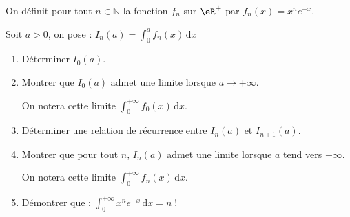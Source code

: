 
\begin{exercice}\label{exoautoanalyseCTU-30}


    On définit pour tout $n\in\mathbb{N}$ la fonction $f_n$ sur $\eR^+$ par $f_n(x)=
    x^n e^{-x}$. 
    
    Soit $a>0$, on pose :
       $ I_n(a) =\displaystyle \int_0^a f_n(x) \,\mathrm dx$

    \begin{enumerate}
        \item Déterminer $I_0(a)$.
        \item Montrer que $I_0(a)$ admet une limite lorsque $a\to+\infty$. 
        
        On notera cette limite
            $\displaystyle\int_0^{+\infty} f_0(x)\,\mathrm dx$.
        \item Déterminer une relation de récurrence entre $I_n(a)$ et $I_{n+1}(a)$.
        \item Montrer que pour tout $n$, $I_n(a)$ admet une limite lorsque $a$ tend vers $+\infty$.
        
            On notera cette limite $\displaystyle\int_0^{+\infty} f_n(x)\,\mathrm dx$.
        \item Démontrer que :
               $ \displaystyle\int_0^{+\infty} x^n e^{-x} \,\mathrm dx = n\;!$
       
    \end{enumerate}



\end{exercice}

